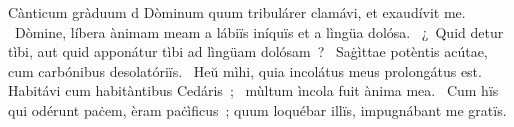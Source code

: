 { Cànticum gràduum}
{%
d Dòminum quum tribulárer clamávi, et exaudívit me. 
~Dòmine, líbera ànimam meam a lábiïs iníquïs et a lìngüa dolósa. 
~¿~Quid detur tìbi, aut quid apponátur tìbi ad lìngüam dolósam~? 
~Saġìttae potèntis acútae, cum carbónibus desolatóriïs. 
~Heŭ mìhi, quia incolátus meus prolongátus est. Habitávi cum habitàntibus Cedáris~; 
~mùltum ìncola fuit ànima mea. 
~Cum hïs qui odérunt paċem, èram paċìficus~; quum loquébar illïs, impugnábant me gratïs. 
}
